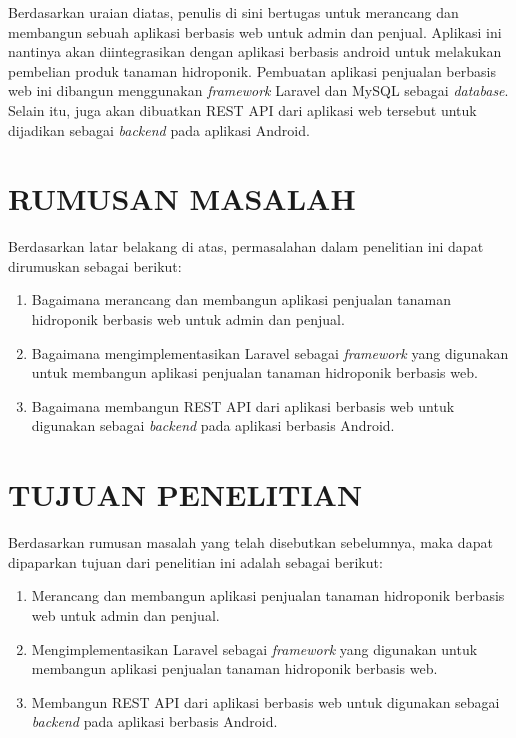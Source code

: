 \par Berdasarkan uraian diatas, penulis di sini bertugas untuk merancang dan membangun sebuah aplikasi berbasis web untuk admin dan penjual. Aplikasi ini nantinya akan diintegrasikan dengan aplikasi berbasis android untuk melakukan pembelian produk tanaman hidroponik. Pembuatan aplikasi penjualan berbasis web ini dibangun menggunakan \textit{framework} Laravel dan MySQL sebagai \textit{database}. Selain itu, juga akan dibuatkan REST API dari aplikasi web tersebut untuk dijadikan sebagai \textit{backend} pada aplikasi Android.

\fancyhf{} 
\fancyfoot[R]{\thepage}

\section{\uppercase{RUMUSAN MASALAH}}
Berdasarkan latar belakang di atas, permasalahan dalam penelitian ini dapat dirumuskan sebagai berikut:
\begin{enumerate}
	\item Bagaimana merancang dan membangun aplikasi penjualan tanaman hidroponik berbasis web untuk admin dan penjual.
	\item Bagaimana mengimplementasikan Laravel sebagai \textit{framework} yang digunakan untuk membangun aplikasi penjualan tanaman hidroponik berbasis web.
	\item Bagaimana membangun REST API dari aplikasi berbasis web untuk digunakan sebagai \textit{backend}  pada aplikasi berbasis Android.
\end{enumerate}

\section{\uppercase{TUJUAN PENELITIAN}}
Berdasarkan rumusan masalah yang telah disebutkan sebelumnya, maka dapat dipaparkan tujuan dari penelitian ini adalah sebagai berikut:
\begin{enumerate}
	\item Merancang dan membangun aplikasi penjualan tanaman hidroponik berbasis web untuk admin dan penjual.
	\item Mengimplementasikan Laravel sebagai \textit{framework} yang digunakan untuk membangun aplikasi penjualan tanaman hidroponik berbasis web.
	\item Membangun REST API dari aplikasi berbasis web untuk digunakan sebagai \textit{backend} pada aplikasi berbasis Android.
\end{enumerate}


